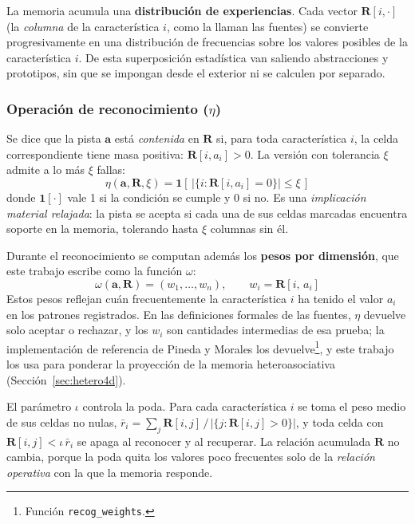 La memoria acumula una \textbf{distribución de experiencias}.
Cada vector $\mathbf{R}[i, \cdot]$ (la \emph{columna} de la característica $i$, como la
llaman las fuentes) se convierte progresivamente en una distribución de
frecuencias sobre los valores posibles de la característica $i$.
De esta superposición estadística van saliendo abstracciones y prototipos, sin que se
impongan desde el exterior ni se calculen por separado.

\subsubsection*{Operación de reconocimiento ($\eta$)}

Se dice que la pista $\mathbf{a}$ está \emph{contenida} en $\mathbf{R}$ si, para toda
característica $i$, la celda correspondiente tiene masa positiva: $\mathbf{R}[i, a_i] > 0$.
La versión con tolerancia $\xi$ admite a lo más $\xi$ fallas:
\begin{equation}
    \eta(\mathbf{a}, \mathbf{R}, \xi) = \mathbf{1}\!\left[\,\bigl|\{i : \mathbf{R}[i, a_i] = 0\}\bigr| \leq \xi\,\right]
    \label{eq:reconocimiento}
\end{equation}
donde $\mathbf{1}[\cdot]$ vale 1 si la condición se cumple y 0 si no.
Es una \emph{implicación material relajada}: la pista se acepta si cada una de sus
celdas marcadas encuentra soporte en la memoria, tolerando hasta $\xi$ columnas sin él.

Durante el reconocimiento se computan además los \textbf{pesos por dimensión}, que este
trabajo escribe como la función $\omega$:
\begin{equation}
    \omega(\mathbf{a}, \mathbf{R}) = (w_1, \ldots, w_n), \qquad w_i = \mathbf{R}[i,\, a_i]
    \label{eq:pesos}
\end{equation}
Estos pesos reflejan cuán frecuentemente la característica $i$ ha tenido el valor $a_i$
en los patrones registrados.
En las definiciones formales de las fuentes, $\eta$ devuelve solo aceptar o rechazar, y
los $w_i$ son cantidades intermedias de esa prueba; la implementación de referencia de
Pineda y Morales los devuelve\footnote{Función \texttt{recog\_weights}.}, y este
trabajo los usa para ponderar la proyección de la memoria heteroasociativa (Sección~\ref{sec:hetero4d}).

El parámetro $\iota$ controla la poda.
Para cada característica $i$ se toma el peso medio de sus celdas no nulas,
$\bar{r}_i = \sum_j \mathbf{R}[i,j] \,/\, |\{j : \mathbf{R}[i,j] > 0\}|$, y toda celda
con $\mathbf{R}[i,j] < \iota\,\bar{r}_i$ se apaga al reconocer y al recuperar.
La relación acumulada $\mathbf{R}$ no cambia, porque la poda quita los valores poco
frecuentes solo de la \emph{relación operativa} con la que la memoria responde.

